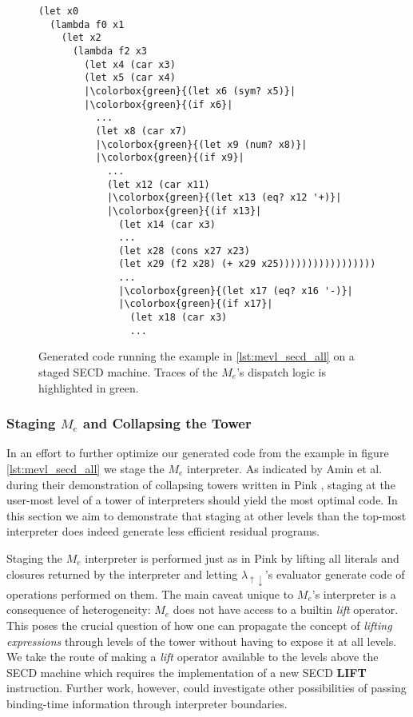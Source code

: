 \documentclass[a4paper,12pt,twoside,openright]{report}
\theoremstyle{definition}
\newcommand{\mslang}{$\lambda_{\uparrow\downarrow}$}
\newcommand{\mevl}{$M_{e}$}
\begin{document}
\begin{figure}[htp!]
\centering
    \begin{verbatim}
(let x0
  (lambda f0 x1
    (let x2
      (lambda f2 x3
        (let x4 (car x3)
        (let x5 (car x4)
        |\colorbox{green}{(let x6 (sym? x5)}|
        |\colorbox{green}{(if x6}|
          ...
          (let x8 (car x7)
          |\colorbox{green}{(let x9 (num? x8)}|
          |\colorbox{green}{(if x9}|
            ...
            (let x12 (car x11)
            |\colorbox{green}{(let x13 (eq? x12 '+)}|
            |\colorbox{green}{(if x13}|
              (let x14 (car x3)
              ...
              (let x28 (cons x27 x23)
              (let x29 (f2 x28) (+ x29 x25)))))))))))))))))
              ...
              |\colorbox{green}{(let x17 (eq? x16 '-)}|
              |\colorbox{green}{(if x17}|
                (let x18 (car x3)
                ...
    \end{verbatim}
\caption{Generated code running the example in \ref{lst:mevl_secd_all} on a staged SECD machine. Traces of the \mevl's dispatch logic is highlighted in green.}
\label{lst:mevl_secd_ped}
\end{figure}
\newpage

\subsubsection{Staging \texorpdfstring{\mevl}{Lg} and Collapsing the Tower}\label{ssubsec:mevl_staged}
In an effort to further optimize our generated code from the example in figure \ref{lst:mevl_secd_all} we stage the \mevl{} interpreter. As indicated by Amin et al. during their demonstration of collapsing towers written in Pink \cite{amin2017collapsing}, staging at the user-most level of a tower of interpreters should yield the most optimal code. In this section we aim to demonstrate that staging at other levels than the top-most interpreter does indeed generate less efficient residual programs.

Staging the \mevl{} interpreter is performed just as in Pink by lifting all literals and closures returned by the interpreter and letting \mslang's evaluator generate code of operations performed on them. The main caveat unique to \mevl's interpreter is a consequence of heterogeneity: \mevl{} does not have access to a builtin \textit{lift} operator. This poses the crucial question of how one can propagate the concept of \textit{lifting expressions} through levels of the tower without having to expose it at all levels. We take the route of making a \textit{lift} operator available to the levels above the SECD machine which requires the implementation of a new SECD \textbf{LIFT} instruction. Further work, however, could investigate other possibilities of passing binding-time information through interpreter boundaries.
\end{document}
